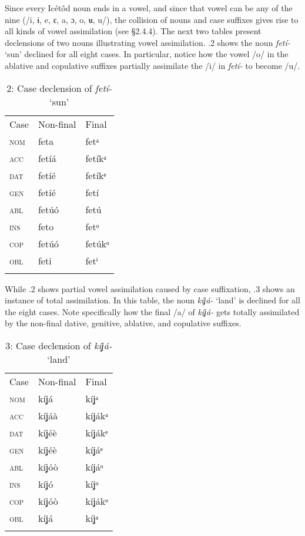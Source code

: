 Since every Icétôd noun ends in a vowel, and since that vowel can be any of the nine (/i, ɨ, e, ɛ, a, ɔ, o, ʉ, u/), the collision of nouns and case suffixes gives rise to all kinds of vowel assimilation (see §2.4.4). The next two tables present declensions of two nouns illustrating vowel assimilation. .2 shows the noun \textit{fetí- }‘sun’ declined for all eight cases. In particular, notice how the vowel /o/ in the ablative and copulative suffixes partially assimilate the /i/ in \textit{fetí- }to become /u/. 


\begin{table}
\caption{2: Case declension of \textit{fetí- }‘sun’}
\label{tab:7}


\begin{tabularx}{\textwidth}{XXX}
\lsptoprule

Case & Non-final & Final\\
\textsc{nom} & feta & fetᵃ\\
\textsc{acc} & fetíá & fetíkᵃ\\
\textsc{dat} & fetíé & fetíkᵉ\\
\textsc{gen} & fetíé & fetí\\
\textsc{abl} & fetúó & fetú\\
\textsc{ins} & feto & fetᵒ\\
\textsc{cop} & fetúó & fetúkᵒ\\
\textsc{obl} & feti & fetⁱ\\
\lspbottomrule
\end{tabularx}
\end{table}
While .2 shows partial vowel assimilation caused by case suffixation, .3 shows an instance of total assimilation. In this table, the noun \textit{kíʝá- }‘land’ is declined for all the eight cases. Note specifically how the final /a/ of \textit{kíʝá- }gets totally assimilated by the non-final dative, genitive, ablative, and copulative suffixes.


\begin{table}
\caption{3: Case declension of \textit{kíʝá-} ‘land’}
\label{tab:7}


\begin{tabularx}{\textwidth}{XXX}
\lsptoprule

Case & Non-final & Final\\
\textsc{nom} & kíʝá & kíʝᵃ\\
\textsc{acc} & kíʝáà & kíʝákᵃ\\
\textsc{dat} & kíʝéè & kíʝákᵉ\\
\textsc{gen} & kíʝéè & kíʝáᵉ\\
\textsc{abl} & kíʝóò & kíʝáᵒ\\
\textsc{ins} & kíʝó & kíʝᵒ\\
\textsc{cop} & kíʝóò & kíʝákᵒ\\
\textsc{obl} & kíʝá & kíʝᵃ\\
\lspbottomrule
\end{tabularx}
\end{table}




